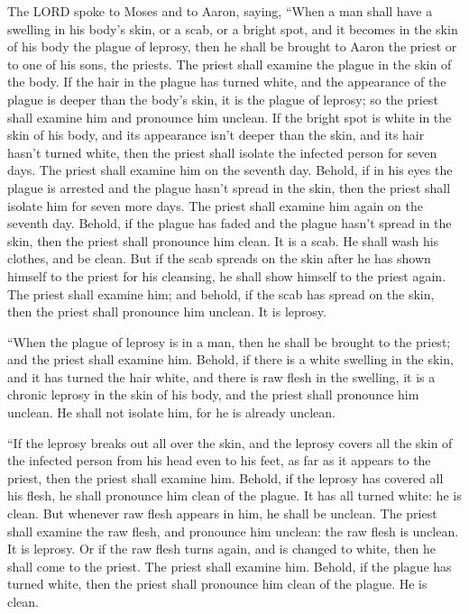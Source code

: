 \mychapter{} \myverse*{}The LORD spoke to Moses and to Aaron, saying,
\myverse{}“When a man shall have a swelling in his body’s skin, or a scab, or a bright
spot, and it becomes in the skin of his body the plague of leprosy, then he shall be brought to Aaron
the priest or to one of his sons, the priests.
\myverse{}The priest shall examine the plague in the skin of the body. If the hair in
the plague has turned white, and the appearance of the plague is deeper than the body’s skin, it is the
plague of leprosy; so the priest shall examine him and pronounce him unclean.
\myverse{}If the bright spot is white in the skin of his body, and its appearance isn’t
deeper than the skin, and its hair hasn’t turned white, then the priest shall isolate the infected person
for seven days.
\myverse{}The priest shall examine him on the seventh day. Behold, if in his eyes the
plague is arrested and the plague hasn’t spread in the skin, then the priest shall isolate him for seven
more days.
\myverse{}The priest shall examine him again on the seventh day. Behold, if the plague
has faded and the plague hasn’t spread in the skin, then the priest shall pronounce him clean. It is a
scab. He shall wash his clothes, and be clean.
\myverse{}But if the scab spreads on the skin after he has shown himself to the priest
for his cleansing, he shall show himself to the priest again.
\myverse{}The priest shall examine him; and behold, if the scab has spread on the skin,
then the priest shall pronounce him unclean. It is leprosy.


\myverse{}“When the plague of leprosy is in a man, then he shall be brought
to the priest;
\myverse{}and the priest shall examine him. Behold, if there is a white swelling in
the skin, and it has turned the hair white, and there is raw flesh in the swelling,
\myverse{}it is a chronic leprosy in the skin of his body, and the priest shall pronounce
him unclean. He shall not isolate him, for he is already unclean.


\myverse{}“If the leprosy breaks out all over the skin, and the leprosy
covers all the skin of the infected person from his head even to his feet, as far as it appears to the
priest,
\myverse{}then the priest shall examine him. Behold, if the leprosy has covered all
his flesh, he shall pronounce him clean of the plague. It has all turned white: he is clean.
\myverse{}But whenever raw flesh appears in him, he shall be unclean.
\myverse{}The priest shall examine the raw flesh, and pronounce him unclean: the raw
flesh is unclean. It is leprosy.
\myverse{}Or if the raw flesh turns again, and is changed to white, then he shall come
to the priest.
\myverse{}The priest shall examine him. Behold, if the plague has turned white, then
the priest shall pronounce him clean of the plague. He is clean.


